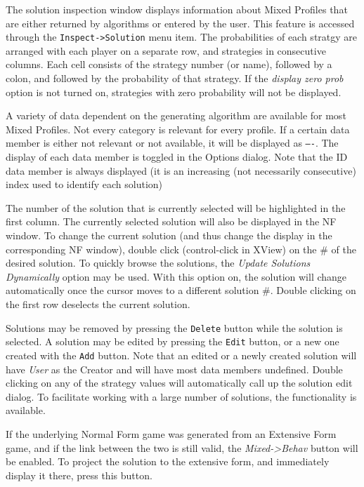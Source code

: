 {The solution inspection window displays information about Mixed Profiles 
that are either returned by algorithms or entered by the user.  This feature 
is accessed through the {\tt Inspect->Solution} menu item.  The 
probabilities of each stratgy are arranged with each player on a separate 
row, and strategies in consecutive columns.  
Each cell consists of the strategy number (or name), followed by a colon, and followed
by the probability of that strategy.
If the {\em display zero prob} option is not turned on, strategies with zero probability
will not be displayed. 

A variety of data dependent on the generating algorithm are available for most 
Mixed Profiles. Not every category is relevant for every profile.  If a
certain data member is either not relevant or not available, it will be 
displayed as {\tt ----}.  The display of each data member is toggled in the
Options dialog.  Note that the ID data member is always displayed (it is
an increasing (not necessarily consecutive) index used to identify each
solution)

The number of the solution that is currently selected will be highlighted 
in the first
column.  The currently selected solution will also be displayed in the NF window.  
To change the current solution (and thus change the display in the 
corresponding NF window), double click (control-click in XView) on the \# of the
desired solution.  To quickly browse the solutions, the 
{\em Update Solutions Dynamically} 
option may be used.  With this option on, the solution will change automatically once
the cursor moves to a different solution \#.  Double clicking on the first
row deselects the current solution.

Solutions may be removed by pressing the {\tt Delete} button while the solution is 
selected.  A solution may
be edited by pressing the {\tt Edit} button, or a new one created 
with the {\tt Add} button.  Note 
that an edited or a newly created solution will have {\em User} as the
Creator and will have most data members undefined.  Double clicking on any
of the strategy values will automatically call up the solution edit dialog.
To facilitate working with a large number of solutions, 
the  functionality is available.

If the underlying Normal Form game was generated from an Extensive Form game, 
and if the link between the two is still 
valid, the {\em Mixed->Behav} button will be enabled.  To project the solution to the 
extensive form, and immediately display it there, press this button.

}
